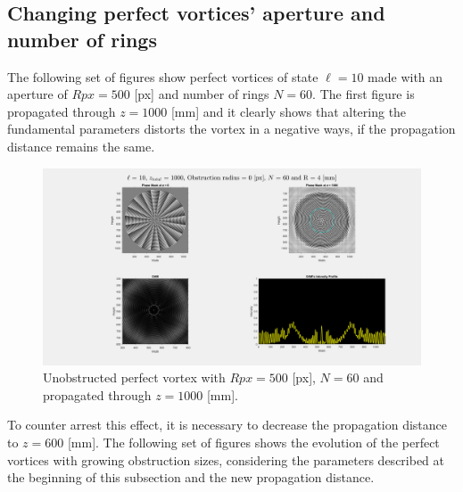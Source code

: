 \newpage
\subsection{Changing perfect vortices' aperture and number of rings}
The following set of figures show perfect vortices of state $\ell = 10$ made with an aperture of $Rpx = 500$ [px] and number of rings $N = 60$. The first figure is propagated through $z = 1000$ [mm] and it clearly shows that altering the fundamental parameters distorts the vortex in a negative ways, if the propagation distance remains the same.

\begin{figure}[htbp]
    \centering
    \includegraphics[width=12cm]{images/Appendices/Additional_Results/Rpx500_N60/type=1_r=0_zi=0_zf=1000.png}
    \caption{Unobstructed perfect vortex with $Rpx = 500$ [px], $N=60$ and propagated through $z = 1000$ [mm].}
    \label{fig:bad_perfect_vortex}
\end{figure}


To counter arrest this effect, it is necessary to decrease the propagation distance to $z = 600$ [mm]. The following set of figures shows the evolution of the perfect vortices with growing obstruction sizes, considering the parameters described at the beginning of this subsection and the new propagation distance.

